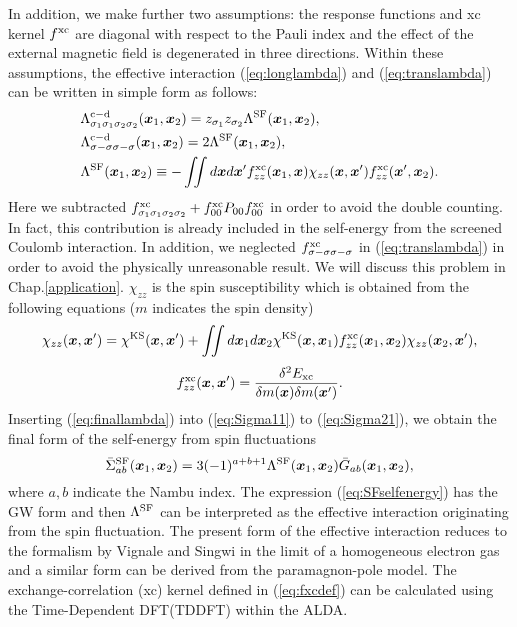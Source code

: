 In addition, we make further two assumptions: the response functions and xc kernel $f^{\rm xc}$ are
diagonal with respect to the Pauli index and the effect of the external magnetic field is degenerated
in three directions. Within these assumptions, the effective interaction (\ref{eq:longlambda}) and
(\ref{eq:translambda}) can be written in simple form as follows:
%
\begin{equation}
	\begin{split}
	&\Lambda^{\rm c - \rm d}_{\sigma_1\sigma_1\sigma_2\sigma_2}(\bm x_1, \bm x_2) = 
	z_{\sigma_1}z_{\sigma_2}\Lambda^{\rm SF}(\bm x_1,\bm x_2), \\
	&\Lambda^{\rm c - \rm d}_{\sigma-\sigma\sigma-\sigma}(\bm x_1, \bm x_2) = 
	2\Lambda^{\rm SF}(\bm x_1,\bm x_2), \\
	&\Lambda^{\rm SF}(\bm x_1,\bm x_2) \equiv -\iint d\bm x d\bm x'
	f^{\rm xc}_{zz}(\bm x_1,\bm x)\chi_{zz}(\bm x,\bm x')f^{\rm xc}_{zz}(\bm x',\bm x_2).
	\label{eq:finallambda}
\end{split}
\end{equation}
%
Here we subtracted $f^{\rm xc}_{\sigma_1\sigma_1\sigma_2\sigma_2}+
f^{\rm xc}_{00}P_{00}f^{\rm xc}_{00}$ in order to avoid the double counting.
In fact, this contribution is already included in the self-energy from the screened Coulomb interaction.
In addition, we neglected $f^{\rm xc}_{\sigma-\sigma\sigma-\sigma}$ in (\ref{eq:translambda})
in order to avoid the physically unreasonable result. We will discuss this problem in Chap.\ref{application}.
$\chi_{zz}$ is the spin susceptibility which is obtained from the following equations
($m$ indicates the spin density)
%
\begin{equation}
	\chi_{zz}(\bm x,\bm x') = \chi^{\rm KS}(\bm x,\bm x') + 
	\iint d\bm x_1 d\bm x_2 \chi^{\rm KS}(\bm x, \bm x_1)f^{\rm xc}_{zz}(\bm x_1, \bm x_2)
	\chi_{zz}(\bm x_2,\bm x'),
	\label{eq:chis}
\end{equation}
%
\begin{equation}
	f^{\rm xc}_{zz}(\bm x,\bm x') = \frac{\delta^2 E_{\rm xc}}{\delta m(\bm x) \delta m(\bm x')}.
	\label{eq:fxcdef}
\end{equation}
%
Inserting (\ref{eq:finallambda}) into (\ref{eq:Sigma11}) to (\ref{eq:Sigma21}), we obtain the 
final form of the self-energy from spin fluctuations
%
\begin{equation}
	\bar{\Sigma}^{\rm SF}_{ab}(\bm x_1,\bm x_2) = 3(-1)^{a+b+1}
	\Lambda^{\rm SF}(\bm x_1, \bm x_2) \bar{G}_{ab}(\bm x_1, \bm x_2),
	\label{eq:SFselfenergy}
\end{equation}
%
where $a, b$ indicate the Nambu index.
The expression (\ref{eq:SFselfenergy}) has the GW form and then $\Lambda^{\rm SF}$ can be interpreted
as the effective interaction originating from the spin fluctuation.
The present form of the effective interaction reduces to the formalism by Vignale and Singwi\cite{Vignale1985} 
in the limit of a homogeneous electron gas and a similar form can be derived from the 
paramagnon-pole model\cite{Zhu1986}.
The exchange-correlation (xc) kernel defined in (\ref{eq:fxcdef}) can be calculated using the Time-Dependent DFT(TDDFT)
\cite{Runge1984} within the ALDA.

